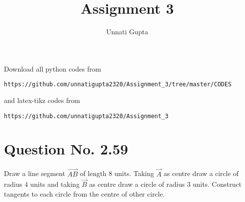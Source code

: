 \documentclass[journal,12pt,twocolumn]{IEEEtran}
\begin{document}
     \def\centbox#1{\makebox[0in]{#1}}
     \def\topbox#1{\raisebox{-\baselineskip}[0in][0in]{#1}}
     \def\midbox#1{\raisebox{-0.5\baselineskip}[0in][0in]{#1}}
\vspace{3cm}
\title{Assignment 3}
\author{Unnati Gupta}
\maketitle
\newpage
\bigskip
\renewcommand{\thefigure}{\theenumi}
\renewcommand{\thetable}{\theenumi}
Download all python codes from 
\begin{lstlisting}
https://github.com/unnatigupta2320/Assignment_3/tree/master/CODES
\end{lstlisting}
%
and latex-tikz codes from 
%
\begin{lstlisting}
https://github.com/unnatigupta2320/Assignment_3
\end{lstlisting}
%
\section{Question No. 2.59}
Draw a line segment $\vec{AB}$ of length 8 units. Taking $\vec{A}$ as centre draw a circle of radius $4$ units and taking $\vec{B}$ as centre draw a circle of radius $3$ units. Construct tangents to each circle from the centre of other circle.

%
\end{document}

